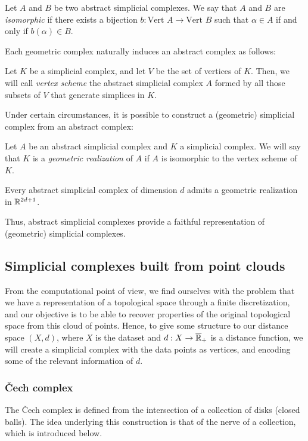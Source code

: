\documentclass[../main.tex]{subfiles}
\begin{document}
\begin{definition}
Let $A$ and $B$ be two abstract simplicial complexes. We say that $A$ and $B$ are \emph{isomorphic} if there exists a bijection $b:\text{Vert }A \to \text{Vert }B$ such that $\alpha \in A$ if and only if $b(\alpha) \in B$.
\end{definition}

Each geometric complex naturally induces an abstract complex as follows:
\begin{definition}
Let $K$ be a simplicial complex, and let $V$ be the set of vertices of $K$. Then, we will call \emph{vertex scheme} the abstract simplicial complex $A$ formed by all those subsets of $V$ that generate simplices in $K$.
\end{definition}

Under certain circumstances, it is possible to construct a (geometric) simplicial complex from an abstract complex:
\begin{definition}
Let $A$ be an abstract simplicial complex and $K$ a simplicial complex. We will say that $K$ is a \emph{geometric realization} of $A$ if $A$ is isomorphic to the vertex scheme of $K$.
\end{definition}

\begin{theorem}
Every abstract simplicial complex of dimension $d$ admits a geometric realization in $\mathbb{R}^{2d + 1}$.
\end{theorem}

Thus, abstract simplicial complexes provide a faithful representation of (geometric) simplicial complexes.

\subsection{Simplicial complexes built from point clouds}
From the computational point of view, we find ourselves with the problem that we have a representation of a topological space through a finite discretization, and our objective is to be able to recover properties of the original topological space from this cloud of points. Hence, to give some structure to our distance space $(X,d)$, where $X$ is the dataset and $d: X \to \overline{\mathbb{R}}_+$ is a distance function, we will create a simplicial complex with the data points as vertices, and encoding some of the relevant information of $d$.

\subsubsection*{\v{C}ech complex}
The \v{C}ech complex is defined from the intersection of a collection of disks (closed balls). The idea underlying this construction is that of the nerve of a collection, which is introduced below.
\end{document}
